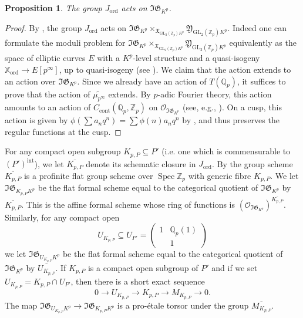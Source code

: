 \documentclass[10pt, oneside]{amsart}
\renewcommand{\tilde}{\widetilde}
\numberwithin{equation}{subsection}
\newtheorem{prop}[equation]{Proposition}
\theoremstyle{definition}
\theoremstyle{remark}
\newcommand{\mbb}[1]{\mathbb{#1}}
\newcommand{\opn}[1]{\operatorname{#1}}
\newcommand{\tbyt}[4]{\left( \begin{matrix} #1 & #2 \\ #3 & #4 \end{matrix} \right)}
\DeclareMathOperator{\Spec}{Spec}
\def\Q{\mathbb{Q}}
\def\Z{{\mathbb{Z}}}
\begin{document}
\begin{prop} 
The group $J_{\opn{ord}}$ acts on $\mathfrak{IG}_{K^p}$.
\end{prop}
\begin{proof} 
By \cite[Corollary 4.3.5]{CS17}, the group $J_{\opn{ord}}$ acts on $\mathfrak{IG}_{K^p} \times_{\mathfrak{X}_{\mathrm{GL}_2(\Z_p)K^p}}  \mathfrak{Y}_{\mathrm{GL}_2(\Z_p)K^p}$. Indeed one can formulate the moduli problem for $\mathfrak{IG}_{K^p} \times_{\mathfrak{X}_{\mathrm{GL}_2(\Z_p)K^p}}  \mathfrak{Y}_{\mathrm{GL}_2(\Z_p)K^p}$ equivalently as the space of elliptic curves $E$ with a $K^p$-level structure and a quasi-isogeny $\mathbb{X}_{\opn{ord}} \rightarrow E[p^\infty]$, up to quasi-isogeny (see \cite[Lemma 4.3.4]{CS17}). We claim that the action extends to an action over $\mathfrak{IG}_{K^p}$. Since we already have an action of $T(\Q_p)$, it suffices to prove that the action of $\tilde{\mu_{p^\infty}}$ extends. By $p$-adic Fourier theory, this action amounts to an action of $C_{\opn{cont}}(\Q_p, \Z_p)$ on $\mathcal{O}_{\mathfrak{IG}_{K^p}}$ (see, e.g., \cite[\S 7]{howe2020unipotent}). On a cusp, this action is given by 
$\phi(\sum a_n q^n)= \sum \phi(n) a_n q^n$ by \cite[Theorem 7.1.1]{howe2020unipotent}, and thus preserves the regular functions at the cusp. 
\end{proof}

For any compact open subgroup $K_{p,P} \subseteq P'$ (i.e. one which is commensurable to $(P')^{\opn{int}}$), we let $\overline{K_{p, P}}$ denote its schematic closure in $J_{\opn{ord}}$. By \cite[Lemma 3.4.8]{BPHHT} the group scheme $\overline{K_{p, P}}$ is a profinite flat group scheme over $\Spec \Z_p$ with generic fibre $K_{p, P}$. We let $\mathfrak{IG}_{K_{p,P}K^p}$ be the flat formal scheme equal to the categorical quotient of $\mathfrak{IG}_{K^p}$ by $\overline{K_{p,P}}$. This is the affine formal scheme whose ring of functions is $(\mathcal{O}_{\mathfrak{IG}_{K^p}})^{\overline{K_{p,P}}}$. Similarly, for any compact open
\[
U_{K_{p,P}} \subseteq U_{P'} = \tbyt{1}{\mbb{Q}_p(1)}{}{1}
\]
we let $\mathfrak{IG}_{U_{K_{p,P}}K^p}$ be the flat formal scheme equal to the categorical quotient of $\mathfrak{IG}_{K^p}$ by $\overline{U_{K_{p,P}}}$. 
If $K_{p,P}$ is a compact open subgroup of $P'$ and if we set $U_{K_{p,P}} = K_{p, P} \cap U_{P'}$, then there is a short exact sequence 
\[
0 \rightarrow U_{K_{p,P}} \rightarrow K_{p,P} \rightarrow M_{K_{p,P}} \rightarrow 0.
\]
The map $\mathfrak{IG}_{U_{K_{p,P}}K^p}\rightarrow \mathfrak{IG}_{{K_{p,P}}K^p}$ is a pro-\'etale torsor under the group $\overline{M_{K_{p,P}}}$. 
\end{document}
